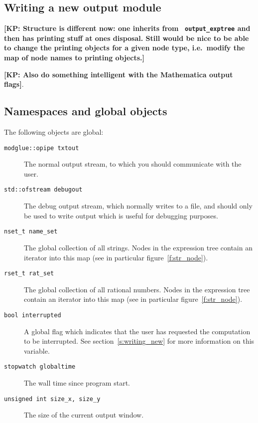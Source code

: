 \documentclass[11pt]{article}
\newcommand{\kcomment}[2]{{\bf [#1: #2]}}
\numberwithin{equation}{section}
\begin{document}


\subsection{Writing a new output module}


\kcomment{KP}{Structure is different now: one inherits from {\tt
output\_exptree} and then has printing stuff at ones disposal. Still
would be nice to be able to change the printing objects for a given
node type, i.e.~modify the map of node names to printing objects.}

\kcomment{KP}{Also do something intelligent with the Mathematica
output flags}.


\subsection{Namespaces and global objects}

The following objects are global:
\begin{description}
\item[{\tt modglue::opipe txtout}] 
The normal output stream, to which you should communicate with the user.
\item[{\tt std::ofstream debugout}]
The debug output stream, which normally writes to a file, and should
only be used to write output which is useful for debugging purposes.
\item[{\tt nset\_t name\_set}]
The global collection of all strings. Nodes in the expression tree
contain an iterator into this map (see in particular figure~\ref{f:str_node}).
\item[{\tt rset\_t rat\_set}]
The global collection of all rational numbers. Nodes in the expression
tree contain an iterator into this map (see in particular figure~\ref{f:str_node}).
\item[{\tt bool interrupted}]
A global flag which indicates that the user has requested the
computation to be interrupted. See section~\ref{s:writing_new} for
more information on this variable.
\item[{\tt stopwatch globaltime}]
The wall time since program start.
\item[{\tt unsigned int size\_x, size\_y}] The size of the current
  output window.
\end{description}
\end{document}
